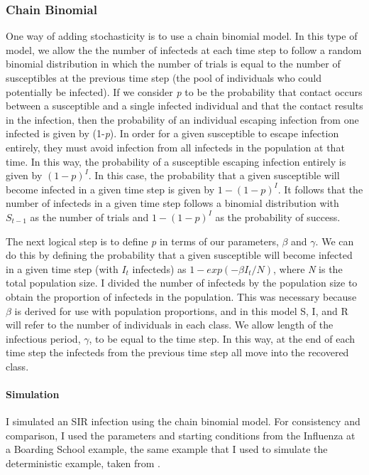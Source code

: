 \documentclass{article}
\begin{document}
\subsubsection{Chain Binomial}
One way of adding stochasticity is to use a chain binomial model. In this type of model, we allow the the number of infecteds at each time step to follow a random binomial distribution in which the number of trials is equal to the number of susceptibles at the previous time step (the pool of individuals who could potentially be infected). If we consider \textit{p} to be the probability that contact occurs between a susceptible and a single infected individual and that the contact results in the infection, then the probability of an individual escaping infection from one infected is given by (1-\textit{p}). In order for a given susceptible to escape infection entirely, they must avoid infection from all infecteds in the population at that time. In this way, the probability of a susceptible escaping infection entirely is given by $(1-p)^{I}$. In this case, the probability that a given susceptible will become infected in a given time step is given by $1-(1-p)^{I}$. It follows that the number of infecteds in a given time step follows a binomial distribution with $S_{t-1}$ as the number of trials and $1-(1-p)^{I}$ as the probability of success. 

The next logical step is to define \textit{p} in terms of our parameters, $\beta$ and $\gamma$. We can do this by defining the probability that a given susceptible will become infected in a given time step (with $I_{t}$ infecteds) as $1-exp(-\beta I_{t}/N)$, where \textit{N} is the total population size. I divided the number of infecteds by the population size to obtain the proportion of infecteds in the population. This was necessary because $\beta$ is derived for use with population proportions, and in this model S, I, and R will refer to the number of individuals in each class. We allow length of the infectious period, $\gamma$, to be equal to the time step. In this way, at the end of each time step the infecteds from the previous time step all move into the recovered class. 

\paragraph{Simulation}

I simulated an SIR infection using the chain binomial model. For consistency and comparison, I used the parameters and starting conditions from the Influenza at a Boarding School example, the same example that I used to simulate the deterministic example, taken from \cite{keeling2011modeling}. 
\end{document}
